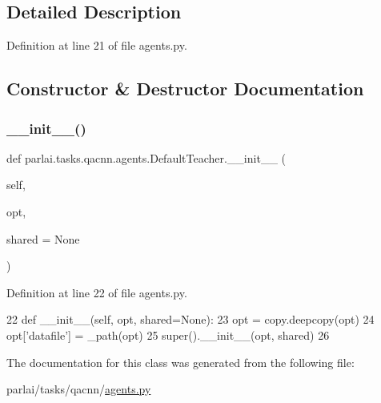 \subsection{Detailed Description}


Definition at line 21 of file agents.\+py.



\subsection{Constructor \& Destructor Documentation}
\mbox{\label{classparlai_1_1tasks_1_1qacnn_1_1agents_1_1DefaultTeacher_a3b62aec4d32ee140251318598822f31c}} 
\subsubsection{\texorpdfstring{\+\_\+\+\_\+init\+\_\+\+\_\+()}{\_\_init\_\_()}}
{\footnotesize\ttfamily def parlai.\+tasks.\+qacnn.\+agents.\+Default\+Teacher.\+\_\+\+\_\+init\+\_\+\+\_\+ (\begin{DoxyParamCaption}\item[{}]{self,  }\item[{}]{opt,  }\item[{}]{shared = {\ttfamily None} }\end{DoxyParamCaption})}



Definition at line 22 of file agents.\+py.


\begin{DoxyCode}
22     \textcolor{keyword}{def }\_\_init\_\_(self, opt, shared=None):
23         opt = copy.deepcopy(opt)
24         opt[\textcolor{stringliteral}{'datafile'}] = \_path(opt)
25         super().\_\_init\_\_(opt, shared)
26 \end{DoxyCode}


The documentation for this class was generated from the following file\+:\begin{DoxyCompactItemize}
\item 
parlai/tasks/qacnn/\hyperlink{parlai_2tasks_2qacnn_2agents_8py}{agents.\+py}\end{DoxyCompactItemize}

